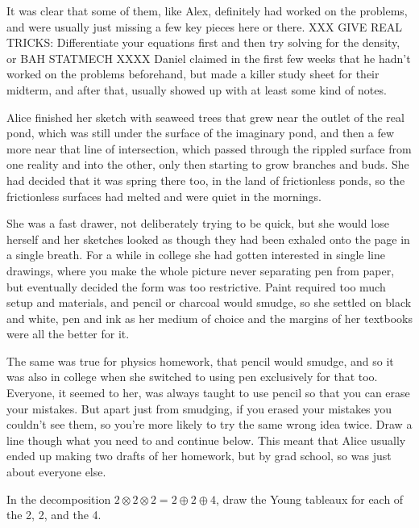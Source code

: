 It was clear that some of them, like Alex, definitely had worked on the problems, and were usually just missing a few key pieces here or there. XXX GIVE REAL TRICKS: Differentiate your equations first and then try solving for the density, or BAH STATMECH XXXX Daniel claimed in the first few weeks that he hadn't worked on the problems beforehand, but made a killer study sheet for their midterm, and after that, usually showed up with at least some kind of notes. 

\mypause

Alice finished her sketch with seaweed trees that grew near the outlet of the real pond, which was still under the surface of the imaginary pond, and then a few more near that line of intersection, which passed through the rippled surface from one reality and into the other, only then starting to grow branches and buds. She had decided that it was spring there too, in the land of frictionless ponds, so the frictionless surfaces had melted and were quiet in the mornings.

She was a fast drawer, not deliberately trying to be quick, but she would lose herself and her sketches looked as though they had been exhaled onto the page in a single breath. For a while in college she had gotten interested in single line drawings, where you make the whole picture never separating pen from paper, but eventually decided the form was too restrictive. Paint required too much setup and materials, and pencil or charcoal would smudge, so she settled on black and white, pen and ink as her medium of choice and the margins of her textbooks were all the better for it. 

The same was true for physics homework, that pencil would smudge, and so it was also in college when she switched to using pen exclusively for that too. Everyone, it seemed to her, was always taught to use pencil so that you can erase your mistakes. But apart just from smudging, if you erased your mistakes you couldn't see them, so you're more likely to try the same wrong idea twice. Draw a line though what you need to and continue below. This meant that Alice usually ended up making two drafts of her homework, but by grad school, so was just about everyone else. 

\mypause

 {\ttfamily In the decomposition $2 \otimes 2 \otimes 2 = 2 \oplus 2 \oplus 4$, draw the Young tableaux for each of the 2, 2, and the 4. }


